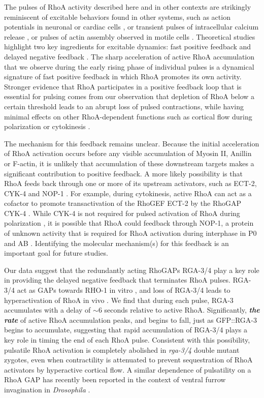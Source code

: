 \documentclass{ucetd}
\begin{document}
The pulses of RhoA activity described here and in other contexts \cite{Munjal:2015bx, Bement:2015jp, Mason:2016bs} are strikingly reminiscent of excitable behaviors found in other systems, such as action potentials in neuronal \cite{Izhikevich:2007aa} or cardiac cells \cite{Luo:1991vz}, or transient pulses of intracellular calcium release \cite{Goldbeter:1996aa}, or pulses of actin assembly observed in motile cells \cite{Weiner:2007cl}. Theoretical studies highlight two key ingredients for excitable dynamics: fast positive feedback and delayed negative feedback \cite{Strogatz:1994tz}. The sharp acceleration of active RhoA accumulation that we observe during the early rising phase of individual pulses is a dynamical signature of fast positive feedback in which RhoA promotes its own activity. Stronger evidence that RhoA participates in a positive feedback loop that is essential for pulsing comes from our observation that depletion of RhoA below a certain threshold leads to an abrupt loss of pulsed contractions, while having minimal effects on other RhoA-dependent functions such as cortical flow during polarization\cite{Motegi:2006hi, Schonegg:2006ed} or cytokinesis \cite{Loria:2012ks}. 

The mechanism for this feedback remains unclear.  Because the initial acceleration of RhoA activation occurs before any visible accumulation of Myosin II, Anillin or F-actin, it is unlikely that accumulation of these downstream targets makes a significant contribution to positive feedback.  A more likely possibility is that RhoA feeds back through one or more of its upstream activators, such as ECT-2, CYK-4 and NOP-1 \cite{Tse:2012fp}.  For example, during cytokinesis, active RhoA can act as a cofactor to promote transactivation of the RhoGEF ECT-2 by the RhoGAP CYK-4 \cite{Zhang:2015bx}.  While CYK-4 is not required for pulsed activation of RhoA during polarization \cite{Tse:2012fp}, it is possible that RhoA could feedback through NOP-1, a protein of unknown activity that is required for RhoA activation during interphase in P0 and AB \cite{Tse:2012fp}. Identifying the molecular mechanism(s) for this feedback is an important goal for future studies.


Our data suggest that the redundantly acting RhoGAPs RGA-3/4 play a key role in providing the delayed negative feedback that terminates RhoA pulses. RGA-3/4 act as GAPs towards RHO-1 in vitro \cite{Schonegg:2007if}, and loss of RGA-3/4 leads to hyperactivation of RhoA in vivo \cite{Tse:2012fp}.  We find that during each pulse, RGA-3 accumulates with a delay of $\sim$6 seconds relative to active RhoA. Significantly, \textit{\textbf{the rate}} of active RhoA accumulation peaks, and begins to fall, just as GFP::RGA-3 begins to accumulate, suggesting that rapid accumulation of RGA-3/4 plays a key role in timing the end of each RhoA pulse. Consistent with this possibility, pulsatile RhoA activation is completely abolished in \textit{rga-3/4} double mutant zygotes, even when contractility is attenuated to prevent sequestration of RhoA activators by hyperactive cortical flow.  A similar dependence of pulsatility on a RhoA GAP has recently been reported in the context of ventral furrow invagination in \textit{Drosophila} \cite{Mason:2016bs}.
\end{document}
